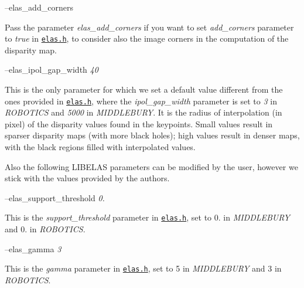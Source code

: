 --elas\+\_\+add\+\_\+corners
\begin{DoxyItemize}
\item Pass the parameter {\itshape elas\+\_\+add\+\_\+corners} if you want to set {\itshape add\+\_\+corners} parameter to {\itshape true} in \href{https://github.com/robotology/stereo-vision/tree/master/lib/elas/include/elas.h}{\tt elas.\+h}, to consider also the image corners in the computation of the disparity map.
\end{DoxyItemize}

--elas\+\_\+ipol\+\_\+gap\+\_\+width {\itshape 40} 
\begin{DoxyItemize}
\item This is the only parameter for which we set a default value different from the ones provided in \href{https://github.com/robotology/stereo-vision/tree/master/lib/elas/include/elas.h}{\tt elas.\+h}, where the {\itshape ipol\+\_\+gap\+\_\+width} parameter is set to {\itshape 3} in {\itshape R\+O\+B\+O\+T\+I\+CS} and {\itshape 5000} in {\itshape M\+I\+D\+D\+L\+E\+B\+U\+RY}. It is the radius of interpolation (in pixel) of the disparity values found in the keypoints. Small values result in sparser disparity maps (with more black holes); high values result in denser maps, with the black regions filled with interpolated values.
\end{DoxyItemize}

Also the following L\+I\+B\+E\+L\+AS parameters can be modified by the user, however we stick with the values provided by the authors.

--elas\+\_\+support\+\_\+threshold {\itshape 0.} 
\begin{DoxyItemize}
\item This is the {\itshape support\+\_\+threshold} parameter in \href{https://github.com/robotology/stereo-vision/tree/master/lib/elas/include/elas.h}{\tt elas.\+h}, set to 0. in {\itshape M\+I\+D\+D\+L\+E\+B\+U\+RY} and 0. in {\itshape R\+O\+B\+O\+T\+I\+CS}.
\end{DoxyItemize}

--elas\+\_\+gamma {\itshape 3} 
\begin{DoxyItemize}
\item This is the {\itshape gamma} parameter in \href{https://github.com/robotology/stereo-vision/tree/master/lib/elas/include/elas.h}{\tt elas.\+h}, set to 5 in {\itshape M\+I\+D\+D\+L\+E\+B\+U\+RY} and 3 in {\itshape R\+O\+B\+O\+T\+I\+CS}.
\end{DoxyItemize}


